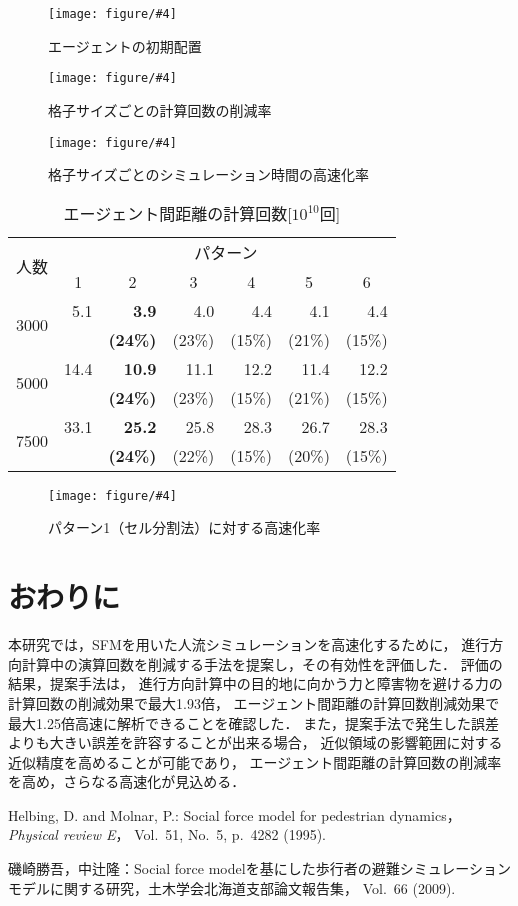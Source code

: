 \documentclass{maelab_y}
\newcommand{\figtb}[5]{ %
\begin{figure}[hbtp]
  \begin{center}
    \texttt{[image: figure/\#4]}
    \caption{#1}
    \label{fig:#5}
  \end{center}
\end{figure}
}%
\newcommand{\分類条件}{%
\begin{table}[t]
\begin{center}
\caption{進行方向を分類する条件}
\ecaption{Classification condition of moving direction $e_{i}$.}
\label{tb:hantei_jouken}
\begin{tabular}{c|c|c|c|c}
\hline \hline
			& 右 & 左 & 上 & 下 \\ \hline
パターン2   & $\frac{1}{\sqrt{2}} < e_x \leq 1  $
		    & $ -1 \leq e_x < \frac{-1}{\sqrt{2}}$ 
		    & $ \frac{-1}{\sqrt{2}} < e_x < \frac{1}{\sqrt{2}} $ 
		    & $ \frac{-1}{2} < e_x < \frac{1}{2} $ \\
パターン3   & $\frac{-1}{2} < e_y < \frac{1}{2} $ 
		    & $\frac{-1}{2} < e_y < \frac{1}{2} $
            & $ \frac{1}{\sqrt{2}} < e_y \leq 1$
		    & $ -1 \leq e_y < \frac{-1}{\sqrt{2}} $ \\
\hline
\multirow{2}{*}{パターン4}   
			& $R_x \geq A_x$ & $R_x < A_x$ & $R_y \geq A_y$ & $R_y < A_y $ \\
	        &  $L_x \geq A_x$ & $L_x < A_x$ & $L_y \geq A_y$ & $L_y < A_y$ \\
\hline
\multirow{2}{*}{パターン5}   
 			& $R_x \geq x_1$ & $R_x < x_2$ & $R_y \geq y_1$ & $R_y < y_2 $ \\
			& $L_x \geq x_1$ & $L_x < x_2$ & $L_y \geq y_1$ & $L_y < y_2 $ \\
\hline
パターン6   & $ \cos(\frac{1}{2}\theta_{view}) \leq  e_y $ 
			& $ e_y \leq -\cos(\frac{1}{2}\theta_{view})$ 
			& $ \sin(\frac{1}{2}(\pi - \theta_{view})) \leq e_x $ 
			& $ e_x \leq \sin(\frac{1}{2}(\pi - \theta_{view}))  $ \\
\hline
\end{tabular}
\end{center}
\end{table}
}%
\newcommand{\距離計算new}{%
  \begin{table}[hbtp]
    \begin{center}
    \caption{エージェント間距離の計算回数[$10^{10}$回]}
    \label{tb:keisan_kaisu}
    \begin{tabular}{c|llllll}
    \hline \hline
    \multirow{2}{*}{人数}   & \multicolumn{6}{c}{パターン}                                                                                                                                                             \\ \cline{2-7} 
                          & \multicolumn{1}{c|}{1}    & \multicolumn{1}{c|}{2}               & \multicolumn{1}{c|}{3}      & \multicolumn{1}{c|}{4}      & \multicolumn{1}{c|}{5}      & \multicolumn{1}{c}{6}    \\ \hline
    \multirow{2}{*}{3000} & \multicolumn{1}{r|}{5.1}  & \multicolumn{1}{r|}{\textbf{3.9}}    & \multicolumn{1}{r|}{4.0}    & \multicolumn{1}{r|}{4.4}    & \multicolumn{1}{r|}{4.1}    & \multicolumn{1}{r}{4.4}  \\
                          & \multicolumn{1}{l|}{}     & \multicolumn{1}{l|}{\textbf{(24\%)}} & \multicolumn{1}{l|}{(23\%)} & \multicolumn{1}{l|}{(15\%)} & \multicolumn{1}{l|}{(21\%)} & (15\%)                   \\ \hline
    \multirow{2}{*}{5000} & \multicolumn{1}{r|}{14.4} & \multicolumn{1}{r|}{\textbf{10.9}}   & \multicolumn{1}{r|}{11.1}   & \multicolumn{1}{r|}{12.2}   & \multicolumn{1}{r|}{11.4}   & \multicolumn{1}{r}{12.2} \\
                          & \multicolumn{1}{l|}{}     & \multicolumn{1}{l|}{\textbf{(24\%)}} & \multicolumn{1}{l|}{(23\%)} & \multicolumn{1}{l|}{(15\%)} & \multicolumn{1}{l|}{(21\%)} & (15\%)                   \\ \hline
    \multirow{2}{*}{7500} & \multicolumn{1}{r|}{33.1} & \multicolumn{1}{r|}{\textbf{25.2}}   & \multicolumn{1}{r|}{25.8}   & \multicolumn{1}{r|}{28.3}   & \multicolumn{1}{r|}{26.7}   & \multicolumn{1}{r}{28.3} \\
                          & \multicolumn{1}{l|}{}     & \multicolumn{1}{l|}{\textbf{(24\%)}} & \multicolumn{1}{l|}{(22\%)} & \multicolumn{1}{l|}{(15\%)} & \multicolumn{1}{l|}{(20\%)} & (15\%)                   \\ \hline
    \end{tabular}
    \end{center}
    \end{table}
}%
\newcommand{\粒子数}{%
\begin{table}[hbtp]
  \begin{center}
    \caption{各配置の詳細}
    \label{tb:haichi_para}
    \begin{tabular}{c|c|c}
      \hline \hline
      & 教室 & 演習室 \\ \hline 
      エージェント数[人] & 96 & 204 \\ \hline
      壁粒子数[個] & 1037 & 1454\\ \hline
      経由地数[個] & 12   & 26 \\ \hline
      解析領域 & $50m\times50m$ & $50m\times50m$ \\ \hline
    \end{tabular}
  \end{center}
\end{table}
}%
\newcommand{\評価環境}{%
\begin{table}[hbtp]
  \begin{center}
    \caption{各配置の詳細}
    \label{tb:haichi_para}
    \begin{tabular}{c|c|c}
      \hline \hline
                 & マシン1                & マシン2 \\ \hline 
      CPU        & Intel Xeon E5-2687W & Intel Xeon E5-2667W \\ \hline
      メモリ     & 64GB                   & 64GB \\ \hline
      OS         & Linux 4.12.9            & Linux 6.5.8 \\ \hline
      コンパイラ & gcc 7.2.0             & gcc 13.2.0 \\ \hline
    \end{tabular}
  \end{center}
\end{table}
}%
\newcommand{\判定条件new}{%
  \begin{table}[hbtp]
    \centering
		\caption{パターンごとの進行方向分類条件}
		\label{tb:joken}
		{\scriptsize
    \begin{tabular}{Wc{0.5em}|cccWc{8em}}
    \hline \hline
                          & \multicolumn{1}{c|}{パターン2，3} & \multicolumn{1}{c|}{パターン4}   & \multicolumn{1}{c|}{パターン5}   & パターン6                   \\ \hline
    \multirow{2}{*}{右}    & \multicolumn{1}{c|}{$\frac{1}{\sqrt{2}} < e_x \leq 1$}  & \multicolumn{1}{c|}{$R_x \geq A_x$}  & \multicolumn{1}{c|}{$R_x \geq x_1$}  & \multirow{2}{*}{$ \cos(\frac{1}{2}\theta_v) \leq  e_y $} \\
                          & \multicolumn{1}{c|}{$\frac{-1}{2} < e_y < \frac{1}{2} $}   & \multicolumn{1}{l|}{$L_x \geq A_x$} & \multicolumn{1}{l|}{$L_x \geq x_1$} &                     \\ \hline
    \multirow{2}{*}{左}    & \multicolumn{1}{c|}{$ -1 \leq e_x < \frac{-1}{\sqrt{2}}$}  & \multicolumn{1}{c|}{$R_x < A_x$}  & \multicolumn{1}{c|}{$R_x < x_2$}  & \multirow{2}{*}{$ e_y \leq -\cos(\frac{1}{2}\theta_{v})$} \\
                          & \multicolumn{1}{l|}{$\frac{-1}{2} < e_y < \frac{1}{2} $}   & \multicolumn{1}{l|}{$L_x < A_x$} & \multicolumn{1}{l|}{$L_x < x_2$ } &                     \\ \hline
    \multirow{2}{*}{上}    & \multicolumn{1}{c|}{$ \frac{-1}{\sqrt{2}} < e_x < \frac{1}{\sqrt{2}}$}  & \multicolumn{1}{c|}{$R_y \geq A_y$ }  & \multicolumn{1}{c|}{$R_y \geq y_1$ }  & \multirow{2}{*}{$ \sin(\frac{1}{2}(\theta_{\pi - v})) \leq e_x$} \\
                          & \multicolumn{1}{l|}{$ \frac{1}{\sqrt{2}} < e_y \leq 1$}   & \multicolumn{1}{l|}{$L_y \geq A_y$} & \multicolumn{1}{l|}{$L_y \geq y_1$} &                     \\ \hline
    \multirow{2}{*}{下}    & \multicolumn{1}{c|}{$ \frac{-1}{2} < e_x < \frac{1}{2} $}  & \multicolumn{1}{c|}{$R_y < A_y $}  & \multicolumn{1}{c|}{$R_y < y_2 $ }  & \multirow{2}{*}{$ e_x \leq \sin(\frac{1}{2}(\theta_{\pi - v}))$} \\
                          & \multicolumn{1}{l|}{$ -1 \leq e_y < \frac{-1}{\sqrt{2}} $}   & \multicolumn{1}{l|}{$L_y < A_y$} & \multicolumn{1}{l|}{$L_y < y_2 $ } &                     \\ \hline
    \end{tabular}
		}
    \end{table}
}%
\begin{document}
\figtb{エージェントの初期配置}{Initial position of agents.}{8}{agent_position.eps}{agent_haichi}

\figtb{格子サイズごとの計算回数の削減率}{}{8.0}{haba_sakugenritu2.eps}{haba_sakugenritu}
\figtb{格子サイズごとのシミュレーション時間の高速化率}{}{8.0}{haba_kousokuka.eps}{haba_kousokuka}

\距離計算new
\figtb{パターン1（セル分割法）に対する高速化率}{}{8}{20230226_kousokuka.eps}{kousokuka2}

\section{おわりに}
本研究では，SFMを用いた人流シミュレーションを高速化するために，
進行方向計算中の演算回数を削減する手法を提案し，その有効性を評価した．
評価の結果，提案手法は，
進行方向計算中の目的地に向かう力と障害物を避ける力の計算回数の削減効果で最大1.93倍，
エージェント間距離の計算回数削減効果で最大1.25倍高速に解析できることを確認した．
また，提案手法で発生した誤差よりも大きい誤差を許容することが出来る場合，
近似領域の影響範囲に対する近似精度を高めることが可能であり，
エージェント間距離の計算回数の削減率を高め，さらなる高速化が見込める．


\begin{thebibliography}{9}
\footnotesize
{}
  Helbing, D. and Molnar, P.: Social force model for pedestrian dynamics，{\em
    Physical review E}， Vol.~51, No.~5, p.\ 4282 (1995).

  磯崎勝吾，中辻隆：Social force
  modelを基にした歩行者の避難シミュレーションモデルに関する研究，土木学会北海道支部論文報告集，
  Vol.~66 (2009).
\end{thebibliography}
\end{document}
